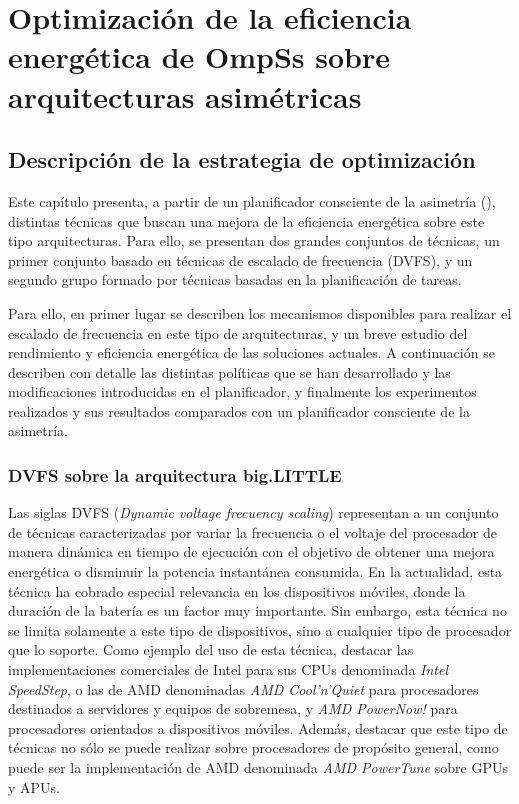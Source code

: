 \cleardoublepage

\chapter{Optimización de la eficiencia energética de OmpSs sobre arquitecturas asimétricas}
\label{ch:chapter5}

\section{Descripción de la estrategia de optimización}

Este capítulo presenta, a partir de un planificador consciente de la
asimetría (\botlev), distintas técnicas que buscan una mejora de la
eficiencia energética sobre este tipo arquitecturas. Para ello, se
presentan dos grandes conjuntos de técnicas, un primer conjunto basado en
técnicas de escalado de frecuencia (DVFS), y un segundo grupo formado
por técnicas basadas en la planificación de tareas.

 Para ello, en primer lugar se describen
los mecanismos disponibles para realizar el escalado de frecuencia en este
tipo de arquitecturas, y un breve estudio del rendimiento y eficiencia
energética de las soluciones actuales. A continuación se describen con
detalle las distintas políticas que se han desarrollado y las
modificaciones introducidas en el planificador, y finalmente los
experimentos realizados y sus resultados comparados con un planificador
consciente de la asimetría.


\subsection{DVFS sobre la arquitectura big.LITTLE}
\label{sec:DVFS_BIGLITTLE}
Las siglas DVFS (\emph{Dynamic voltage frecuency scaling}) representan a un
conjunto de técnicas caracterizadas por variar la frecuencia o el voltaje
del procesador de manera dinámica en tiempo de ejecución con el objetivo de
obtener una mejora energética o disminuir la potencia instantánea
consumida. En la actualidad, esta técnica ha cobrado especial relevancia en
los dispositivos móviles, donde la duración de la batería es un factor muy
importante. Sin embargo, esta técnica no se limita solamente a este tipo de
dispositivos, sino a cualquier tipo de procesador que lo soporte. Como
ejemplo del uso de esta técnica, destacar las implementaciones comerciales
de Intel para sus CPUs denominada \emph{Intel SpeedStep}, o las de AMD
denominadas \emph{AMD Cool'n'Quiet} para procesadores destinados a
servidores y equipos de sobremesa, y \emph{AMD PowerNow!}  para
procesadores orientados a dispositivos móviles. Además, destacar que este
tipo de técnicas no sólo se puede realizar sobre procesadores de propósito
general, como puede ser la implementación de AMD denominada \emph{AMD
  PowerTune} sobre GPUs y APUs.

